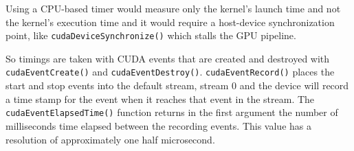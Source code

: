 Using a CPU-based timer would measure only the kernel's launch time and not the kernel's execution time and it would require a host-device synchronization point, like \texttt{cudaDeviceSynchronize()} which stalls the GPU pipeline.

So timings are taken with CUDA events that are created and destroyed with \texttt{cudaEventCreate()} and \texttt{cudaEventDestroy()}. \texttt{cudaEventRecord()} places the start and stop events into the default stream, stream 0 and the device will record a time stamp for the event when it reaches that event in the stream. 
The \texttt{cudaEventElapsedTime()} function returns in the first argument the number of milliseconds time elapsed between the recording events. This value has a resolution of approximately one half microsecond.







